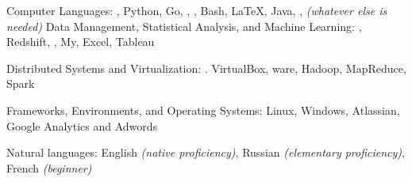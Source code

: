\documentclass[10pt,letterpaper]{article} %
\begin{document}
\spacedhrule{0.5em}{-0.4em}



\inlineheadsection
    {Computer Languages:}
    {, Python, Go, , , Bash, \LaTeX,
      Java, , \textit{(whatever else is needed)}
    }
    \inlineheadsection
        {Data Management, Statistical Analysis, and Machine Learning:}
        {, Redshift, , My, Excel, Tableau}

    \inlineheadsection
        {Distributed Systems and Virtualization:}
        {. VirtualBox, ware, Hadoop, MapReduce, Spark}

    \inlineheadsection
        {Frameworks, Environments, and Operating Systems:}
        {Linux, Windows, Atlassian, Google Analytics and Adwords}

    \inlineheadsection
        {Natural languages:}
        {English \textit{(native proficiency)}, Russian
          \textit{(elementary proficiency)}, French \textit{(beginner)}}

\spacedhrule{2.0em}{-0.4em}






\end{document}

